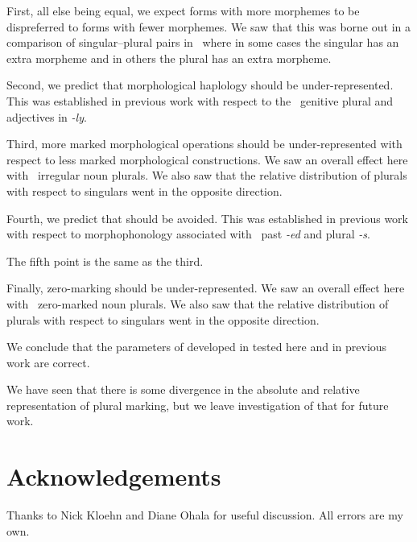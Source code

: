 \documentclass[output=paper,
modfonts
]{LSP/langsci}
\begin{document}
First, all else being equal, we expect forms with more morphemes to be dispreferred to forms with fewer morphemes. We saw that this was borne out in a comparison of singular--plural pairs in \w\ where in some cases the singular has an extra morpheme and in others the plural has an extra morpheme.

Second, we predict that morphological haplology should be under-represented. This was established in previous work with respect to the \e\ genitive plural and adjectives in \emph{-ly}.

Third, more marked morphological operations should be under-represented with respect to less marked morphological constructions. We saw an overall effect here with \e\ irregular noun plurals. We also saw that the relative distribution of plurals with respect to singulars went in the opposite direction.

Fourth, we predict that  should be avoided. This was established in previous work with respect to morphophonology associated with \e\ past \emph{-ed} and plural \emph{-s}.

The fifth point is the same as the third.

Finally, zero-marking should be under-represented. We saw an overall effect here with \e\ zero-marked noun plurals. We also saw that the relative distribution of plurals with respect to singulars went in the opposite direction.

We conclude that the parameters of  developed in \citet{dimensions} tested here and in previous work are correct.

We have seen that there is some divergence in the absolute and relative representation of plural marking, but we leave investigation of that for future work.

\section*{Acknowledgements}

Thanks to Nick Kloehn and Diane Ohala for useful discussion. All errors are my own.

\printbibliography[heading=subbibliography,notkeyword=this]
\end{document}
